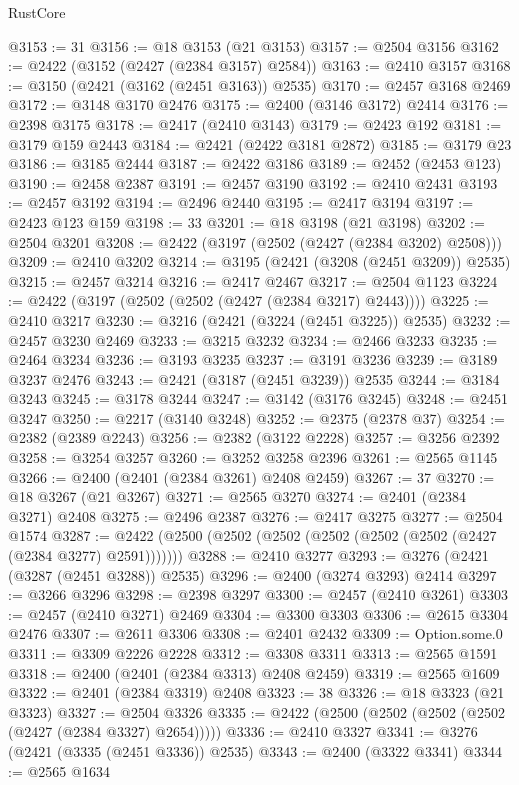 \begin{lexlean}{RustCore}
\begin{coremodule}
@3153 := 31
@3156 := @18 @3153 (@21 @3153)
@3157 := @2504 @3156
@3162 := @2422 (@3152 (@2427 (@2384 @3157) @2584))
@3163 := @2410 @3157
@3168 := @3150 (@2421 (@3162 (@2451 @3163)) @2535)
@3170 := @2457 @3168 @2469
@3172 := @3148 @3170 @2476
@3175 := @2400 (@3146 @3172) @2414
@3176 := @2398 @3175
@3178 := @2417 (@2410 @3143)
@3179 := @2423 @192
@3181 := @3179 @159 @2443
@3184 := @2421 (@2422 @3181 @2872)
@3185 := @3179 @23
@3186 := @3185 @2444
@3187 := @2422 @3186
@3189 := @2452 (@2453 @123)
@3190 := @2458 @2387
@3191 := @2457 @3190
@3192 := @2410 @2431
@3193 := @2457 @3192
@3194 := @2496 @2440
@3195 := @2417 @3194
@3197 := @2423 @123 @159
@3198 := 33
@3201 := @18 @3198 (@21 @3198)
@3202 := @2504 @3201
@3208 := @2422 (@3197 (@2502 (@2427 (@2384 @3202) @2508)))
@3209 := @2410 @3202
@3214 := @3195 (@2421 (@3208 (@2451 @3209)) @2535)
@3215 := @2457 @3214
@3216 := @2417 @2467
@3217 := @2504 @1123
@3224 := @2422 (@3197 (@2502 (@2502 (@2427 (@2384 @3217) @2443))))
@3225 := @2410 @3217
@3230 := @3216 (@2421 (@3224 (@2451 @3225)) @2535)
@3232 := @2457 @3230 @2469
@3233 := @3215 @3232
@3234 := @2466 @3233
@3235 := @2464 @3234
@3236 := @3193 @3235
@3237 := @3191 @3236
@3239 := @3189 @3237 @2476
@3243 := @2421 (@3187 (@2451 @3239)) @2535
@3244 := @3184 @3243
@3245 := @3178 @3244
@3247 := @3142 (@3176 @3245)
@3248 := @2451 @3247
@3250 := @2217 (@3140 @3248)
@3252 := @2375 (@2378 @37)
@3254 := @2382 (@2389 @2243)
@3256 := @2382 (@3122 @2228)
@3257 := @3256 @2392
@3258 := @3254 @3257
@3260 := @3252 @3258 @2396
@3261 := @2565 @1145
@3266 := @2400 (@2401 (@2384 @3261) @2408 @2459)
@3267 := 37
@3270 := @18 @3267 (@21 @3267)
@3271 := @2565 @3270
@3274 := @2401 (@2384 @3271) @2408
@3275 := @2496 @2387
@3276 := @2417 @3275
@3277 := @2504 @1574
@3287 := @2422 (@2500 (@2502 (@2502 (@2502 (@2502 (@2502 (@2427 (@2384 @3277) @2591)))))))
@3288 := @2410 @3277
@3293 := @3276 (@2421 (@3287 (@2451 @3288)) @2535)
@3296 := @2400 (@3274 @3293) @2414
@3297 := @3266 @3296
@3298 := @2398 @3297
@3300 := @2457 (@2410 @3261)
@3303 := @2457 (@2410 @3271) @2469
@3304 := @3300 @3303
@3306 := @2615 @3304 @2476
@3307 := @2611 @3306
@3308 := @2401 @2432
@3309 := Option.some.{0}
@3311 := @3309 @2226 @2228
@3312 := @3308 @3311
@3313 := @2565 @1591
@3318 := @2400 (@2401 (@2384 @3313) @2408 @2459)
@3319 := @2565 @1609
@3322 := @2401 (@2384 @3319) @2408
@3323 := 38
@3326 := @18 @3323 (@21 @3323)
@3327 := @2504 @3326
@3335 := @2422 (@2500 (@2502 (@2502 (@2502 (@2427 (@2384 @3327) @2654)))))
@3336 := @2410 @3327
@3341 := @3276 (@2421 (@3335 (@2451 @3336)) @2535)
@3343 := @2400 (@3322 @3341)
@3344 := @2565 @1634

\end{coremodule}
\end{lexlean}
